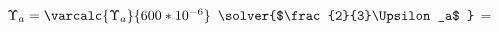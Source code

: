 
$ \Upsilon_a = \varcalc{\Upsilon_a}{600*10^{-6}}$
$ \solver{$\frac{2}{3}\Upsilon_a$ }$ = \answer
\panswer

